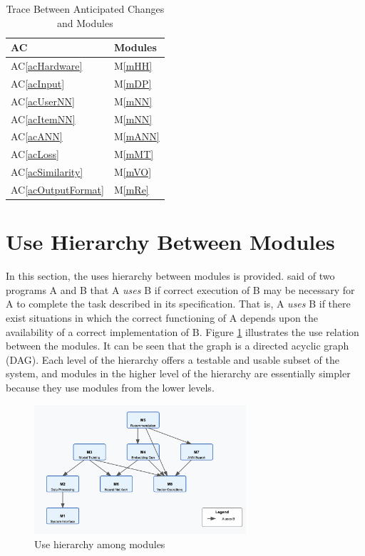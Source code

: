 \documentclass[12pt, titlepage]{article}
\newcommand{\acref}[1]{AC\ref{#1}}
\newcommand{\mref}[1]{M\ref{#1}}
\begin{document}
\begin{table}[H]
\centering
\begin{tabular}{p{} p{}}
\toprule
\textbf{AC} & \textbf{Modules}\\
\midrule
\acref{acHardware} & \mref{mHH}\\
\acref{acInput} & \mref{mDP}\\
\acref{acUserNN} & \mref{mNN}\\
\acref{acItemNN} & \mref{mNN}\\
\acref{acANN} & \mref{mANN}\\
\acref{acLoss} & \mref{mMT}\\
\acref{acSimilarity} & \mref{mVO}\\
\acref{acOutputFormat} & \mref{mRe}\\
\bottomrule
\end{tabular}
\caption{Trace Between Anticipated Changes and Modules}
\label{TblACT}
\end{table}

\section{Use Hierarchy Between Modules} \label{SecUse}

In this section, the uses hierarchy between modules is
provided. \citet{Parnas1978} said of two programs A and B that A {\em uses} B if
correct execution of B may be necessary for A to complete the task described in
its specification. That is, A {\em uses} B if there exist situations in which
the correct functioning of A depends upon the availability of a correct
implementation of B.  Figure \ref{FigUH} illustrates the use relation between
the modules. It can be seen that the graph is a directed acyclic graph
(DAG). Each level of the hierarchy offers a testable and usable subset of the
system, and modules in the higher level of the hierarchy are essentially simpler
because they use modules from the lower levels.

\begin{figure}[H]
\centering
\includegraphics[width=0.7\textwidth]{UsesHierarchy.png}
\caption{Use hierarchy among modules}
\label{FigUH}
\end{figure}
\end{document}
